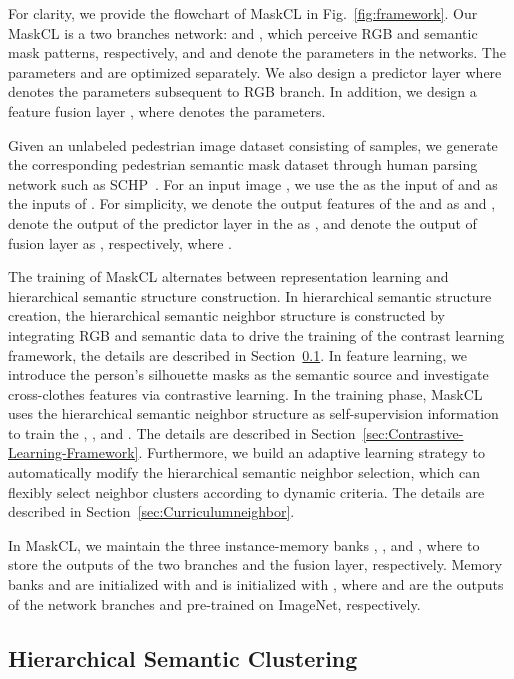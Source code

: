 \documentclass[10pt,twocolumn,letterpaper]{article}
\begin{document}
For clarity, we provide the flowchart of MaskCL in Fig.~\ref{fig:framework}. Our MaskCL is a two branches network:  and , which perceive RGB and 
semantic mask patterns, respectively, and  and  denote the parameters in the networks. 
The parameters  and  are optimized separately.  We also design a predictor layer  where  denotes the parameters subsequent to RGB branch.
In addition, we design a feature fusion layer , where  denotes the parameters.



Given an unlabeled pedestrian image dataset  consisting of  samples,  we generate the corresponding pedestrian semantic mask dataset   through human parsing network such as SCHP~\cite{ParsingNet:TPAMI20}. 
For an input image , 
we use the  as the input of  and  as the inputs of .
For simplicity, we denote the output features of the   and  as  and , 
denote the output of the predictor layer in the  as , 
and denote the output of fusion layer  as , respectively, where . 



The training of MaskCL alternates between representation learning and hierarchical semantic structure construction. 
In hierarchical semantic structure creation, the hierarchical semantic neighbor structure is constructed by integrating RGB and semantic data to drive the training of the contrast learning framework, the details are described  in Section~\ref{sec:Hierarchical Semantic}. 
In feature learning, we introduce the person's silhouette masks as the semantic source and investigate cross-clothes features via contrastive learning.
In the training phase, MaskCL uses the hierarchical semantic neighbor structure as self-supervision information to train the , ,  and . The details are described  in Section~\ref{sec:Contrastive-Learning-Framework}.
Furthermore, we build an adaptive learning strategy to automatically modify the hierarchical semantic neighbor selection, which can flexibly select neighbor clusters according to dynamic criteria. 
The details are described  in Section~\ref{sec:Curriculumneighbor}.


 In MaskCL, we maintain the three instance-memory banks , , and , where 
to store the outputs of the two branches and the fusion layer,  respectively. 
Memory banks  and  are initialized with  and  is initialized with , where  and  are the outputs of the network branches  and  pre-trained on ImageNet, respectively.





\subsection{Hierarchical Semantic Clustering}
\label{sec:Hierarchical Semantic}
\end{document}
